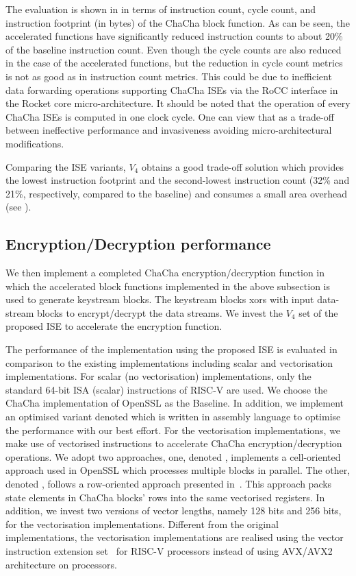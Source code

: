 The evaluation is shown in  in terms of instruction count, cycle count, and instruction footprint (in bytes) of the ChaCha block function. As can be seen, the accelerated functions have significantly reduced instruction counts to about 20\% of the baseline instruction count. Even though the cycle counts are also reduced in the case of the accelerated functions, but the reduction in cycle count metrics is not as good as in instruction count metrics. This could be due to inefficient data forwarding operations supporting ChaCha ISEs via the RoCC interface in the Rocket core micro-architecture. It should be noted that the operation of every ChaCha ISEs is computed in one clock cycle. One can view that as a trade-off between ineffective performance and invasiveness avoiding micro-architectural modifications.

Comparing the ISE variants, $V_4$ obtains a good trade-off solution which provides the lowest instruction footprint and the second-lowest instruction count (32\% and 21\%, respectively, compared to the baseline) and consumes a small area overhead (see ).

\subsection{Encryption/Decryption performance}
We then implement a completed ChaCha encryption/decryption function in which the accelerated block functions implemented in the above subsection is used to generate keystream blocks. The keystream blocks xors with input data-stream blocks to encrypt/decrypt the data streams. We invest the $V_4$ set of the proposed ISE to accelerate the encryption function. 

The performance of the implementation using the proposed ISE is evaluated in comparison to the existing implementations including scalar and vectorisation implementations.  
For scalar (no vectorisation) implementations, only the standard 64-bit ISA (scalar) instructions of RISC-V are used. We choose the ChaCha implementation of OpenSSL as the Baseline. In addition, we implement an optimised variant denoted  which is written in assembly language to optimise the performance with our best effort. 
For the vectorisation implementations, we make use of vectorised instructions to accelerate ChaCha encryption/decryption operations. 
We adopt two approaches, one, denoted , implements a cell-oriented approach used in OpenSSL which processes multiple blocks in parallel.
The other, denoted , follows a row-oriented approach presented in~\cite{GolGue:14}. This approach packs state elements in ChaCha blocks' rows into the same vectorised registers.
In addition, we invest two versions of vector lengths, namely 128 bits and 256 bits, for the vectorisation implementations. 
Different from the original implementations, the vectorisation implementations are realised using the vector instruction extension set~\cite{riscv:ext:vector:draft} for RISC-V processors instead of using AVX/AVX2 architecture on  processors.


